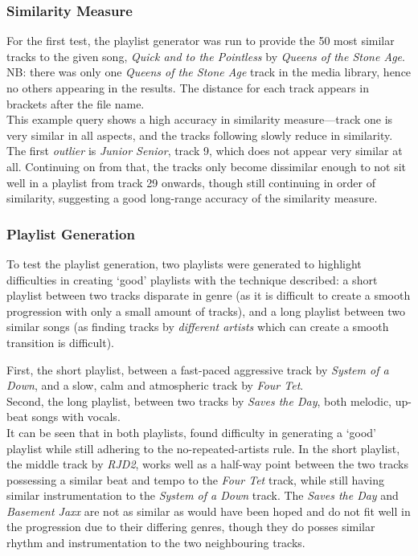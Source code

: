 \subsubsection{Similarity Measure}
For the first test, the playlist generator was run to provide the 50 most similar tracks to the given song, \emph{Quick and to the Pointless} by \emph{Queens of the Stone Age}. NB: there was only one \emph{Queens of the Stone Age} track in the media library, hence no others appearing in the results. The distance for each track appears in brackets after the file name.\\

This example query shows a high accuracy in similarity measure---track one is very similar in all aspects, and the tracks following slowly reduce in similarity. The first \emph{outlier} is \emph{Junior Senior}, track 9, which does not appear very similar at all. Continuing on from that, the tracks only become dissimilar enough to not sit well in a playlist from track 29 onwards, though still continuing in order of similarity, suggesting a good long-range accuracy of the similarity measure. 
\subsubsection{Playlist Generation}
To test the playlist generation, two playlists were generated to highlight difficulties in creating `good' playlists with the technique described: a short playlist between two tracks disparate in genre (as it is difficult to create a smooth progression with only a small amount of tracks), and a long playlist between two similar songs (as finding tracks by \emph{different artists} which can create a smooth transition is difficult).

First, the short playlist, between a fast-paced aggressive track by \emph{System of a Down}, and a slow, calm and atmospheric track by \emph{Four Tet}.\\

Second, the long playlist, between two tracks by \emph{Saves the Day}, both melodic, up-beat songs with vocals.\\

It can be seen that in both playlists,  found difficulty in generating a `good' playlist while still adhering to the no-repeated-artists rule. In the short playlist, the middle track by \emph{RJD2}, works well as a half-way point between the two tracks possessing a similar beat and tempo to the \emph{Four Tet} track, while still having similar instrumentation to the \emph{System of a Down} track. The \emph{Saves the Day} and \emph{Basement Jaxx} are not as similar as would have been hoped and do not fit well in the progression due to their differing genres, though they do posses similar rhythm and instrumentation to the two neighbouring tracks.

